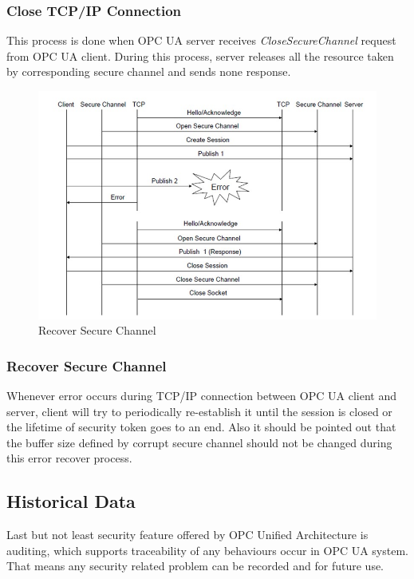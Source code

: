 \documentclass[]{llncs}
\begin{document}
\subsubsection{Close TCP/IP Connection}
This process is done when OPC UA server receives \emph{CloseSecureChannel} request from OPC UA client. During this process, server releases all the resource taken by corresponding secure channel and sends none response.
\begin{figure}[ht]
	\centering
	\includegraphics[width=1\textwidth]{tcp_3.jpg}
		\caption[ ]{Recover Secure Channel\cite{O6}}
	\label{fig:tcp_3}
\end{figure}

\subsubsection{Recover Secure Channel}


Whenever error occurs during TCP/IP connection between OPC UA client and server, client will try to periodically re-establish it until the session is closed or the lifetime of security token goes to an end. Also it should be pointed out that the buffer size defined by corrupt secure channel should not be changed during this error recover process.

\subsection{Historical Data}
Last but not least security feature offered by OPC Unified Architecture is auditing, which supports traceability of any behaviours occur in OPC UA system. That means any security related problem can be recorded and for future use.
\end{document}
